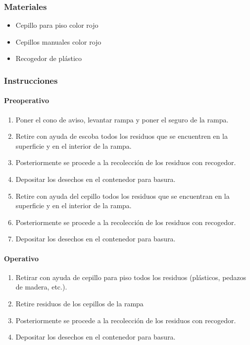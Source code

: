\subsubsection{Materiales}
\begin{itemize}
	\item Cepillo para piso color rojo
	\item Cepillos manuales color rojo
	\item Recogedor de plástico
\end{itemize}

\subsubsection{Instrucciones}
\paragraph{Preoperativo}

\begin{enumerate}
	\item Poner el cono de aviso, levantar rampa y poner el seguro de la rampa.
	\item Retire con ayuda de escoba todos los residuos que se encuentren en la superficie y en el interior de la rampa.
	\item Posteriormente se procede a la recolección de los residuos con recogedor.
	\item Depositar los desechos en el contenedor para basura.
	\item Retire con ayuda del cepillo todos los residuos que se encuentran en la superficie y en el interior de la rampa.
	\item Posteriormente se procede a la recolección de los residuos con recogedor.
	\item Depositar los desechos en el contenedor para basura.
\end{enumerate}

\paragraph{Operativo}
\begin{enumerate}
	\item Retirar con ayuda de cepillo para piso todos los residuos (plásticos, pedazos de madera, etc.).
	\item Retire residuos de los cepillos de la rampa
	\item Posteriormente se procede a la recolección de los residuos con recogedor.
	\item Depositar los desechos en el contenedor para basura.
\end{enumerate}

